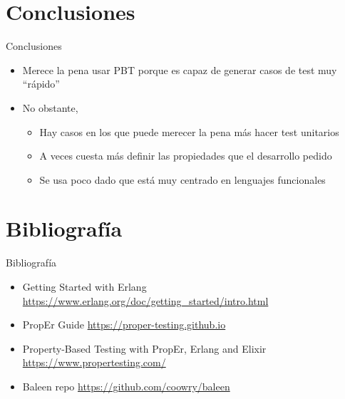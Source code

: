 \documentclass{beamer}
\begin{document}
  \section{Conclusiones}
    \begin{frame}{Conclusiones}
      \begin{itemize}
        \item Merece la pena usar PBT porque es capaz de generar casos de test muy ``rápido''
        \item No obstante,
        \begin{itemize}
          \item Hay casos en los que puede merecer la pena más hacer test unitarios
          \item A veces cuesta más definir las propiedades que el desarrollo
          pedido
          \item Se usa poco dado que está muy centrado en lenguajes funcionales
        \end{itemize}
      \end{itemize}
    \end{frame}

  \section{Bibliografía}
    \begin{frame}{Bibliografía}
      \begin{itemize}
        \item Getting Started with Erlang \url{https://www.erlang.org/doc/getting_started/intro.html}
        \item PropEr Guide \url{https://proper-testing.github.io}
        \item Property-Based Testing with PropEr, Erlang and Elixir \url{https://www.propertesting.com/}
        \item Baleen repo \url{https://github.com/coowry/baleen}
      \end{itemize}
    \end{frame}
\end{document}
